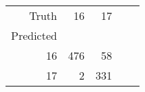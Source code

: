 \begin{table}[h]
\centering
\label{table:5}
\begin{tabular}{rrrrr}
\toprule
Truth & 16 & 17 \\
Predicted &  &  \\
\midrule
16 & 476 & 58 \\
17 & 2 & 331 \\
\bottomrule
\end{tabular}
\end{table}
